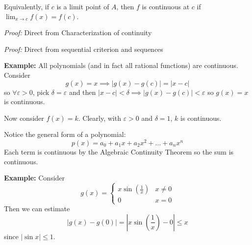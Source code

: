 \documentclass[12pt]{report}
\newcommand{\R}{\mathbb{R}}
\newcommand{\abs}[1]{\left\vert #1 \right\vert}
\newcommand{\ep}{\varepsilon}
\newenvironment*{tbox}[2][gray]{
    \begin{tcolorbox}[
        parbox=false,
        colback=#1!5!white,
        colframe=#1!75!black,
        breakable,
        title={#2}
    ]}
    {\end{tcolorbox}}
\begin{document}
    Equivalently, if $c$ is a limit point of $A$, then $f$ is continuous at $c$ if $\lim_{x\to c} f(x) = f(c)$.

    \begin{tbox}{\textbf{Corollary (Criterion for discontinuity):} $f: A \to \R$, $c \in A$ be a limit point of $A$. If $\exists (x_n) \in A$ with $(x_n) \to c$ but with $f(x_n) \nrightarrow f(c)$, then $f$ is not continuous at $c$. }
        \emph{Proof:} Direct from Characterization of continuity
    \end{tbox}

    \begin{tbox}{\textbf{Algebraic Continuity Theorem:} Assume $f: A \to \R$, $g: A \to \R$ are continuous at $c \in A$. Then 
        \begin{enumerate}
            \item $kf(x)$ is continuous at $c$ for any $k \in \R$
            \item $f(x) + g(x)$ is continuous at $c$ for any continuous functions $f$ and $g$
            \item $f(x)g(x)$ is continuous at $c$ 
            \item $\frac{f(x)}{g(x)}$ is continuous at $c$ provided $g(c) \neq 0$
        \end{enumerate}}
        \emph{Proof:} Direct from sequential criterion and sequences
    \end{tbox}

    \textbf{Example:} All polynomials (and in fact all rational functions) are continuous. Consider 
    \[g(x) = x \implies \abs{g(x) - g(c)} = \abs{x - c}\] 
    so $\forall \ep > 0$, pick $\delta = \ep$ and then $\abs{x - c} < \delta \implies \abs{g(x) - g(c)} < \ep$ so $g(x) = x$ is continuous. 

    Now consider $f(x) = k$. Clearly, with $\ep > 0$ and $\delta =1$, $k$ is continuous. 

    Notice the general form of a polynomial: 
    \[p(x) = a_0 + a_1 x + a_2 x^2 + \dots + a_n x^n\]
    Each term is continuous by the Algebraic Continuity Theorem so the sum is continuous.

    \textbf{Example:} Consider 
    \[g(x) = \begin{cases}
        x \sin(\frac{1}{x}) & x \neq 0 \\
        0 & x = 0
    \end{cases}\]
    Then we can estimate 
    \[\abs{g(x) - g(0)} = \abs{x \sin(\frac{1}{x}) - 0} \leq x\]
    since $\abs{\sin x} \leq 1$. 
\end{document}
